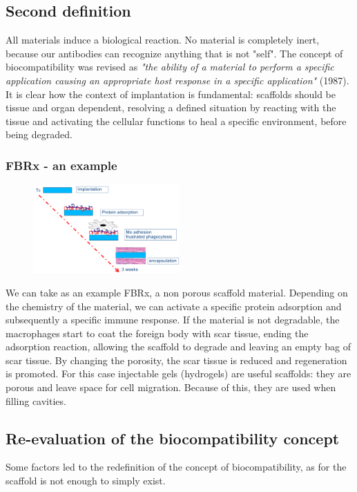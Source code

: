 	\subsection{Second definition}
	All materials induce a biological reaction.
	No material is completely inert, because our antibodies can recognize anything that is not "self".
	The concept of biocompatibility was revised as \textit{"the ability of a material to perform a specific application causing an appropriate host response in a specific application"} (1987).
	It is clear how the context of implantation is fundamental: scaffolds should be tissue and organ dependent, resolving a defined situation by reacting with the tissue and activating the cellular functions to heal a specific environment, before being degraded.

		\subsubsection{FBRx - an example}

		\begin{figure}[ht]
			\centering
			\includegraphics[width=0.5\textwidth]{fbrx.png}
			\caption{\label{fig:matrixome}}
		\end{figure}

		We can take as an example FBRx, a non porous scaffold material.
		Depending on the chemistry of the material, we can activate a specific protein adsorption and subsequently a specific immune response.
		If the material is not degradable, the macrophages start to coat the foreign body with scar tissue, ending the adsorption reaction, allowing the scaffold to degrade and leaving an empty bag of scar tissue.
		By changing the porosity, the scar tissue is reduced and regeneration is promoted.
		For this case injectable gels (hydrogels) are useful scaffolds: they are porous and leave space for cell migration.
		Because of this, they are used when filling cavities.

	\subsection{Re-evaluation of the biocompatibility concept}
	Some factors led to the redefinition of the concept of biocompatibility, as for the scaffold is not enough to simply exist.

